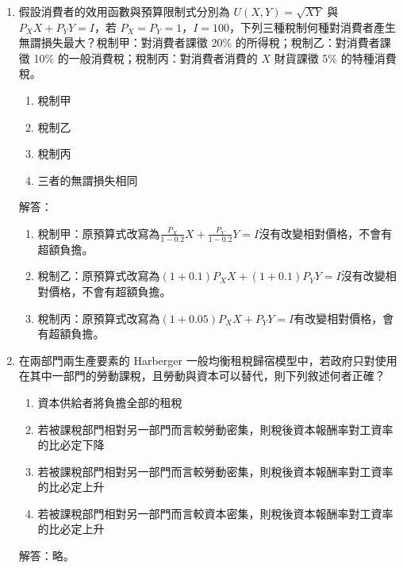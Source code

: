 \documentclass[12pt, a4paper]{article}
\begin{document}
\begin{enumerate}
    \item 假設消費者的效用函數與預算限制式分別為 \(U(X, Y) = \sqrt{XY}\) 與 \(P_X X + P_Y Y = I\)，若 \(P_X = P_Y = 1\)，\(I = 100\)，下列三種稅制何種對消費者產生無謂損失最大？稅制甲：對消費者課徵 20\% 的所得稅；稅制乙：對消費者課徵 10\% 的一般消費稅；稅制丙：對消費者消費的 \(X\) 財貨課徵 5\% 的特種消費稅。
    \begin{enumerate}[label=\Alph*.]
        \item 稅制甲
        \item 稅制乙
        \item 稅制丙
        \item 三者的無謂損失相同
    \end{enumerate}
    解答：
    \begin{enumerate}[label=\Alph*.]
        \item 稅制甲：原預算式改寫為$\frac{P_X}{1-0.2} X + \frac{P_Y}{1-0.2} Y = I$沒有改變相對價格，不會有超額負擔。
        \item 稅制乙：原預算式改寫為$(1+0.1)P_X X + (1+0.1)P_Y Y = I$沒有改變相對價格，不會有超額負擔。
        \item 稅制丙：原預算式改寫為$(1+0.05)P_X X + P_Y Y = I$有改變相對價格，會有超額負擔。
    \end{enumerate}

    \newpage

    \item 在兩部門兩生產要素的 Harberger 一般均衡租稅歸宿模型中，若政府只對使用在其中一部門的勞動課稅，且勞動與資本可以替代，則下列敘述何者正確？
    \begin{enumerate}[label=\Alph*.]
        \item 資本供給者將負擔全部的租稅
        \item 若被課稅部門相對另一部門而言較勞動密集，則稅後資本報酬率對工資率的比必定下降
        \item 若被課稅部門相對另一部門而言較勞動密集，則稅後資本報酬率對工資率的比必定上升
        \item 若被課稅部門相對另一部門而言較資本密集，則稅後資本報酬率對工資率的比必定上升
    \end{enumerate}
    解答：略。


\end{enumerate}
\end{document}
